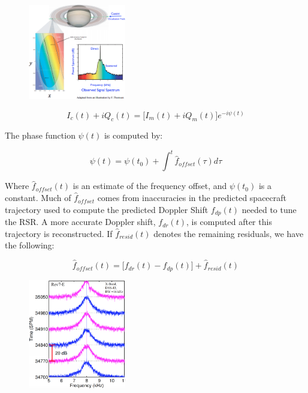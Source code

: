 \documentclass{article}
\theoremstyle{mystyle}
\begin{document}
\begin{figure}
	\begin{center}
	\includegraphics[width = 0.38\textwidth]{USER_7a}
	\end{center}
\end{figure}

\begin{equation}
I_{c}(t) +iQ_{c}(t) = \big[I_{m}(t)+iQ_{m}(t)\big]e^{-i\psi(t)}
\end{equation}

\noindent The phase function $\psi(t)$ is computed by:

\begin{equation}
\psi(t) = \psi(t_0)+\int^{t} \hat{f}_{offset}(\tau)d\tau
\end{equation}

Where $\hat{f}_{offset}(t)$ is an estimate of the frequency offset, and $\psi(t_0)$ is a constant. Much of $\hat{f}_{offset}$ comes from inaccuracies in the predicted spacecraft trajectory used to compute the predicted Doppler Shift $f_{dp}(t)$ needed to tune the RSR. A more accurate Doppler shift, $f_{dr}(t)$, is computed after this trajectory is reconstructed. If $\hat{f}_{resid}(t)$ denotes the remaining residuals, we have the following:

\begin{equation}
\hat{f}_{offset}(t) = \big[f_{dr}(t)-f_{dp}(t)\big] + \hat{f}_{resid}(t)
\end{equation}

\begin{figure}
	\begin{center}
	\includegraphics[width = 0.38\textwidth]{USER_7}
	\end{center}
\end{figure}
\end{document}
